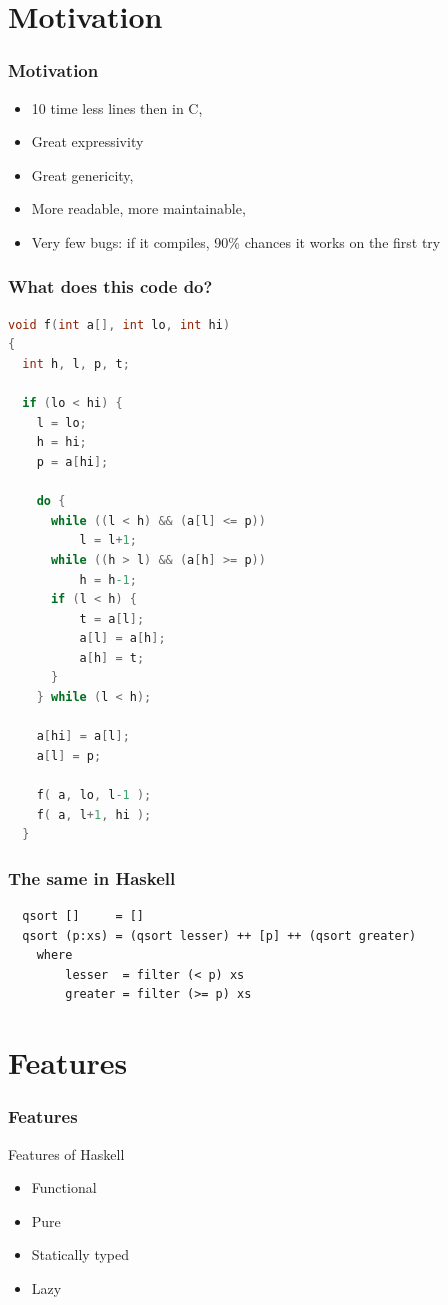 \documentclass{beamer}
\begin{document}
\section{Motivation}
\begin{frame}
\frametitle{Motivation}

 \begin{itemize}
  \item 10 time less lines then in C,
  \item Great expressivity
  \item Great genericity,
  \item More readable, more maintainable,
  \item Very few bugs: if it compiles, 90\% chances it works on the first try
 \end{itemize}
 
\end{frame}


\begin{frame}[fragile]
\frametitle{What does this code do?}

\begin{lstlisting}[language=C, basicstyle=\tiny]
void f(int a[], int lo, int hi) 
{
  int h, l, p, t;

  if (lo < hi) {
    l = lo;
    h = hi;
    p = a[hi];

    do {
      while ((l < h) && (a[l] <= p)) 
          l = l+1;
      while ((h > l) && (a[h] >= p))
          h = h-1;
      if (l < h) {
          t = a[l];
          a[l] = a[h];
          a[h] = t;
      }
    } while (l < h);

    a[hi] = a[l];
    a[l] = p;

    f( a, lo, l-1 );
    f( a, l+1, hi );
  }
\end{lstlisting}

\end{frame}

\begin{frame}[fragile]
\frametitle{The same in Haskell}

\begin{lstlisting}
  qsort []     = []
  qsort (p:xs) = (qsort lesser) ++ [p] ++ (qsort greater)
    where
        lesser  = filter (< p) xs
        greater = filter (>= p) xs

\end{lstlisting}

\end{frame}


\section{Features}
\begin{frame}
\frametitle{Features}
Features of Haskell

 \begin{itemize}
  \item Functional
  \item Pure
  \item Statically typed
  \item Lazy
 \end{itemize}

\end{frame}
\end{document}
